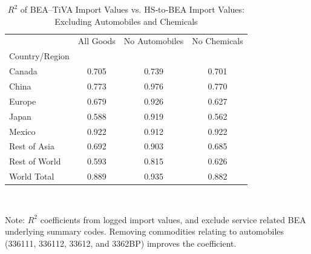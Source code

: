 \begin{table}[htbp]
\centering
\caption{$R^2$ of BEA--TiVA Import Values vs. HS‐to‐BEA Import Values: Excluding Automobiles and Chemicals}
\label{correlation_coefficent_regions}
\begin{tabular}{lccc}
\toprule
 & All Goods & No Automobiles & No Chemicals \\
Country/Region &  &  &  \\
\midrule
Canada & 0.705 & 0.739 & 0.701 \\
China & 0.773 & 0.976 & 0.770 \\
Europe & 0.679 & 0.926 & 0.627 \\
Japan & 0.588 & 0.919 & 0.562 \\
Mexico & 0.922 & 0.912 & 0.922 \\
Rest of Asia & 0.692 & 0.903 & 0.685 \\
Rest of World & 0.593 & 0.815 & 0.626 \\
World Total & 0.889 & 0.935 & 0.882 \\
\bottomrule
\end{tabular}
\vspace{0.01cm}\\
\raggedright
{\scriptsize Note: $R^2$ coefficients from logged import values, and exclude service related BEA underlying summary codes. Removing commodities relating to automobiles (336111, 336112, 33612, and 3362BP) improves the coefficient.}

\end{table}
